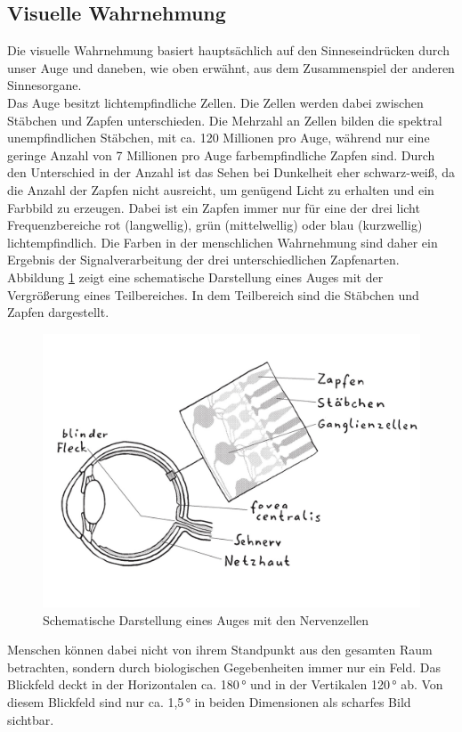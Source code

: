 \subsection{Visuelle Wahrnehmung}
Die visuelle Wahrnehmung basiert hauptsächlich auf den Sinneseindrücken durch unser Auge und daneben, wie oben erwähnt, aus dem Zusammenspiel der anderen Sinnesorgane. \\
Das Auge besitzt lichtempfindliche Zellen. Die Zellen werden dabei zwischen Stäbchen und Zapfen unterschieden. Die Mehrzahl an Zellen bilden die spektral unempfindlichen Stäbchen, mit ca. 120 Millionen pro Auge, während nur eine geringe Anzahl von 7 Millionen pro Auge farbempfindliche Zapfen sind. Durch den Unterschied in der Anzahl ist das Sehen bei Dunkelheit eher schwarz-weiß, da die Anzahl der Zapfen nicht ausreicht, um genügend Licht zu erhalten und ein Farbbild zu erzeugen. Dabei ist ein Zapfen immer nur für eine der drei licht Frequenzbereiche rot (langwellig), grün (mittelwellig) oder blau (kurzwellig) lichtempfindlich. Die Farben in der menschlichen Wahrnehmung sind daher ein Ergebnis der Signalverarbeitung der drei unterschiedlichen Zapfenarten. \cite[Vgl. Seite 14]{Buhler.2017}\\
Abbildung \ref{fig:Auge} zeigt eine schematische Darstellung eines Auges mit der Vergrößerung eines Teilbereiches. In dem Teilbereich sind die Stäbchen und Zapfen dargestellt. \\
\begin{figure}[hbt]
	\centering
	\includegraphics[width=0.5\linewidth]{images/Auge}
	\caption[Schematische Darstellung eines Auges mit den Nervenzellen]{Schematische Darstellung eines Auges mit den Nervenzellen \cite[Seite 141]{Schonhammer.2013}}
	\label{fig:Auge}
\end{figure}
Menschen können dabei nicht von ihrem Standpunkt aus den gesamten Raum betrachten, sondern durch biologischen Gegebenheiten immer nur ein Feld. Das Blickfeld deckt in der Horizontalen ca. 180\,° und in der Vertikalen 120\,° ab. Von diesem Blickfeld sind nur ca. 1,5\,° in beiden Dimensionen als scharfes Bild sichtbar. \\
